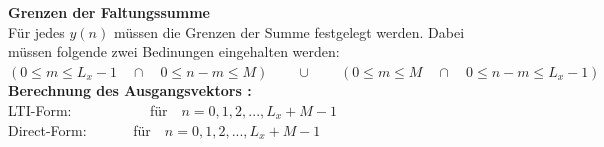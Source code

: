 		\textbf{Grenzen der Faltungssumme}\\[0.2cm]
		Für jedes $y(n)$ müssen die Grenzen der Summe festgelegt werden. Dabei müssen folgende zwei Bedinungen eingehalten werden:\\[0.2cm]
		$(0\leq m\leq L_x-1\quad\cap\quad0\leq n-m\leq M )\qquad\cup\qquad (0\leq m\leq M \quad\cap\quad 0\leq n-m\leq L_x-1)$ \\[0.2cm]
		\textbf{Berechnung des Ausgangsvektors :}\\[0.4cm]
		LTI-Form:$\qquad\;\;\;\;$$\qquad\,$ für$\quad n = 0,1,2,...,L_x+M-1$\\[0.4cm]
		Direct-Form:$\qquad$$\quad$ für$\quad n = 0,1,2,...,L_x+M-1$\\[0.2cm]
		


